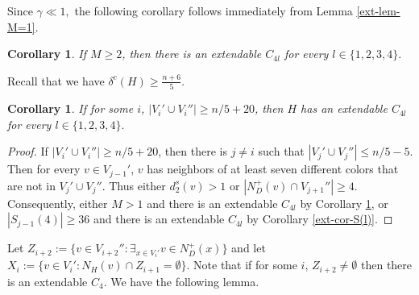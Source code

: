 \documentclass{article}
\newtheorem{cor}[theorem]{Corollary}
\begin{document}
Since $\gamma \ll 1,$ the following corollary follows immediately from Lemma \ref{ext-lem-M=1}.
\begin{cor}\label{ext-cor-M=1}
    If $M\geq 2$, then there is an extendable $C_{4l}$ for every $l\in \{1,2, 3,4\}.$
\end{cor}
Recall that we have $\delta^c(H)\geq \frac{n+6}{5}$. 
\begin{cor}\label{ext-cor-size}
If for some $i$, $|V_i'\cup V_i''|\geq n/5+ 20$, then  $H$ has an extendable $C_{4l}$ for every $l\in \{1,2, 3,4\}.$
\end{cor}
\begin{proof}
If $|V_i'\cup V_i''|\geq n/5+ 20$, then there is $j\neq i$ such that $|V_{j}'\cup V_j''|\leq n/5 - 5$. Then for every $v\in V_{j-1}'$, $v$ has neighbors of at least seven different colors that are not in $V_{j}'\cup V_j''$. Thus either $d^s_2(v)>1$ or $|N^+_D(v)\cap V_{j+1}''|\geq 4.$ Consequently, either $M>1$ and there is an extendable $C_{4l}$ by Corollary \ref{ext-cor-M=1}, or $|S_{j-1}(4)|\geq 36$ and there is an extendable $C_{4l}$ by Corollary \ref{ext-cor-S(l)}.
\end{proof}

Let $Z_{i+2}:= \{v\in V_{i+2}'' : \exists_{x\in V_i'} v\in N_D^+(x)\}$ and let $X_{i}:= \{v\in V_{i}' : N_H(v)\cap Z_{i+1}=\emptyset\}$. Note that if for some $i$, $Z_{i+2}\neq \emptyset$ then there is an extendable $C_4$. 
We have the following lemma.
\end{document}
